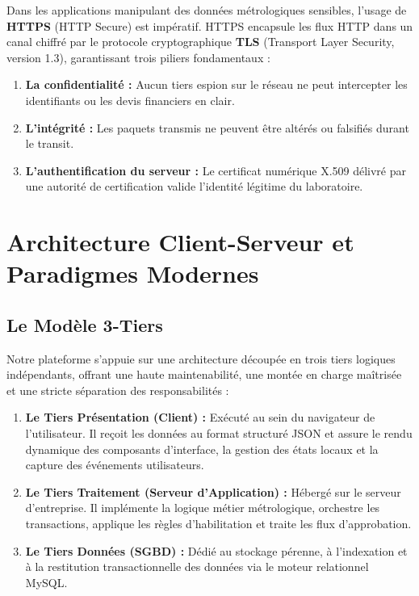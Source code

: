 \documentclass{bts-report}
\begin{document}
Dans les applications manipulant des donn\'ees m\'etrologiques sensibles, l'usage de \textbf{HTTPS} (HTTP Secure) est imp\'eratif. HTTPS encapsule les flux HTTP dans un canal chiffr\'e par le protocole cryptographique \textbf{TLS} (Transport Layer Security, version 1.3), garantissant trois piliers fondamentaux :
\begin{enumerate}
  \item \textbf{La confidentialit\'e :} Aucun tiers espion sur le r\'eseau ne peut intercepter les identifiants ou les devis financiers en clair.
  \item \textbf{L'int\'egrit\'e :} Les paquets transmis ne peuvent \^etre alt\'er\'es ou falsifi\'es durant le transit.
  \item \textbf{L'authentification du serveur :} Le certificat num\'erique X.509 d\'elivr\'e par une autorit\'e de certification valide l'identit\'e l\'egitime du laboratoire.
\end{enumerate}

\section{Architecture Client-Serveur et Paradigmes Modernes}
\subsection{Le Mod\`ele 3-Tiers}
Notre plateforme s'appuie sur une architecture d\'ecoup\'ee en trois tiers logiques ind\'ependants, offrant une haute maintenabilit\'e, une mont\'ee en charge ma\^itris\'ee et une stricte s\'eparation des responsabilit\'es :
\begin{enumerate}
  \item \textbf{Le Tiers Pr\'esentation (Client) :} Ex\'ecut\'e au sein du navigateur de l'utilisateur. Il re\c{c}oit les donn\'ees au format structur\'e JSON et assure le rendu dynamique des composants d'interface, la gestion des \'etats locaux et la capture des \'ev\'enements utilisateurs.
  \item \textbf{Le Tiers Traitement (Serveur d'Application) :} H\'eberg\'e sur le serveur d'entreprise. Il impl\'emente la logique m\'etier m\'etrologique, orchestre les transactions, applique les r\`egles d'habilitation et traite les flux d'approbation.
  \item \textbf{Le Tiers Donn\'ees (SGBD) :} D\'edi\'e au stockage p\'erenne, \`a l'indexation et \`a la restitution transactionnelle des donn\'ees via le moteur relationnel MySQL.
\end{enumerate}
\end{document}
